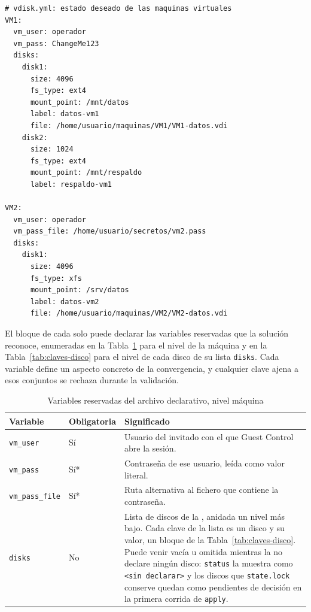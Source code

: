 \begin{lstlisting}[caption={Archivo declarativo estándar vdisk.yml}, label={lst:vdisk}]
# vdisk.yml: estado deseado de las maquinas virtuales
VM1:
  vm_user: operador
  vm_pass: ChangeMe123
  disks:
    disk1:
      size: 4096
      fs_type: ext4
      mount_point: /mnt/datos
      label: datos-vm1
      file: /home/usuario/maquinas/VM1/VM1-datos.vdi
    disk2:
      size: 1024
      fs_type: ext4
      mount_point: /mnt/respaldo
      label: respaldo-vm1

VM2:
  vm_user: operador
  vm_pass_file: /home/usuario/secretos/vm2.pass
  disks:
    disk1:
      size: 4096
      fs_type: xfs
      mount_point: /srv/datos
      label: datos-vm2
      file: /home/usuario/maquinas/VM2/VM2-datos.vdi
\end{lstlisting}

El bloque de cada \vm{} solo puede declarar las variables reservadas que la solución reconoce, enumeradas en la Tabla~\ref{tab:claves} para el nivel de la máquina y en la Tabla~\ref{tab:claves-disco} para el nivel de cada disco de su lista \texttt{disks}. Cada variable define un aspecto concreto de la convergencia, y cualquier clave ajena a esos conjuntos se rechaza durante la validación.

\begin{table}[H]
    \centering
    \caption{Variables reservadas del archivo declarativo, nivel máquina}
    \label{tab:claves}
    \begin{tabular}{@{}llp{8.4cm}@{}}
        \toprule
        \textbf{Variable} & \textbf{Obligatoria} & \textbf{Significado} \\
        \midrule
        \texttt{vm\_user} & Sí & Usuario del invitado con el que Guest Control abre la sesión. \\
        \texttt{vm\_pass} & Sí* & Contraseña de ese usuario, leída como valor literal. \\
        \texttt{vm\_pass\_file} & Sí* & Ruta alternativa al fichero que contiene la contraseña. \\
        \texttt{disks} & No & Lista de discos de la \vm{}, anidada un nivel más bajo. Cada clave de la lista es un disco y su valor, un bloque de la Tabla~\ref{tab:claves-disco}. Puede venir vacía u omitida mientras la \vm{} no declare ningún disco: \texttt{status} la muestra como \texttt{<sin declarar>} y los discos que \texttt{state.lock} conserve quedan como pendientes de decisión en la primera corrida de \texttt{apply}. \\
        \bottomrule
    \end{tabular}
\end{table}

